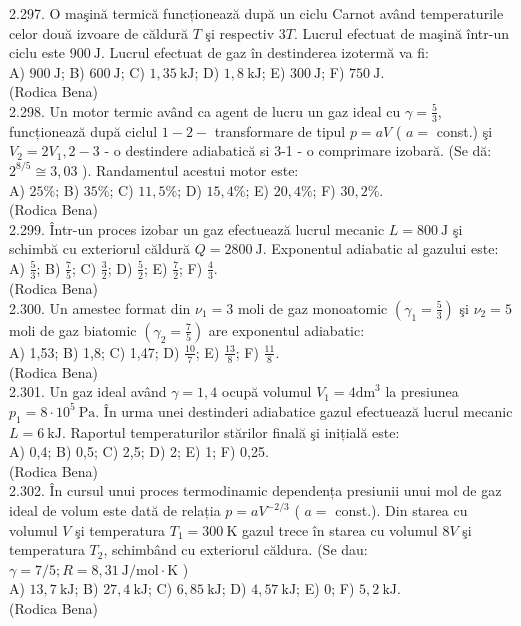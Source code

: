 2.297. O maşină termică funcționează după un ciclu Carnot având temperaturile celor două izvoare de căldură $T$ şi respectiv $3 T$. Lucrul efectuat de maşină într-un ciclu este $900 \mathrm{~J}$. Lucrul efectuat de gaz în destinderea izotermă va fi:\\ A) $900 \mathrm{~J}$; B) $600 \mathrm{~J}$; C) $1,35 \mathrm{~kJ}$; D) $1,8 \mathrm{~kJ}$; E) $300 \mathrm{~J}$; F) $750 \mathrm{~J}$.\\ (Rodica Bena)\\

2.298. Un motor termic având ca agent de lucru un gaz ideal cu $\gamma=\frac{5}{3}$, funcționează după ciclul $1-2-$ transformare de tipul $p=a V$ ( $a=$ const.) şi $V_{2}=2 V_{1}, 2-3$ - o destindere adiabatică si 3-1 - o comprimare izobară. (Se dă: $2^{8 / 5} \cong 3,03$ ). Randamentul acestui motor este:\\ A) $25 \%$; B) $35 \%$; C) $11,5 \%$; D) $15,4 \%$; E) $20,4 \%$; F) $30,2 \%$.\\ (Rodica Bena)\\

2.299. Într-un proces izobar un gaz efectuează lucrul mecanic $L=800 \mathrm{~J}$ şi schimbă cu exteriorul căldură $Q=2800 \mathrm{~J}$. Exponentul adiabatic al gazului este:\\ A) $\frac{5}{3}$; B) $\frac{7}{5}$; C) $\frac{3}{2}$; D) $\frac{5}{2}$; E) $\frac{7}{2}$; F) $\frac{4}{3}$.\\ (Rodica Bena)\\

2.300. Un amestec format din $\nu_{1}=3$ moli de gaz monoatomic $\left(\gamma_{1}=\frac{5}{3}\right)$ şi $\nu_{2}=5$ moli de gaz biatomic $\left(\gamma_{2}=\frac{7}{5}\right)$ are exponentul adiabatic:\\ A) 1,53; B) 1,8; C) 1,47; D) $\frac{10}{7}$; E) $\frac{13}{8}$; F) $\frac{11}{8}$.\\ (Rodica Bena)\\

2.301. Un gaz ideal având $\gamma=1,4$ ocupă volumul $V_{1}=4 \mathrm{dm}^{3}$ la presiunea $p_{1}=8 \cdot 10^{5} \mathrm{~Pa}$. În urma unei destinderi adiabatice gazul efectuează lucrul mecanic $L=6 \mathrm{~kJ}$. Raportul temperaturilor stărilor finală şi inițială este:\\ A) 0,4; B) 0,5; C) 2,5; D) 2; E) 1; F) 0,25.\\ (Rodica Bena)\\

2.302. În cursul unui proces termodinamic dependența presiunii unui mol de gaz ideal de volum este dată de relația $p=a V^{-2 / 3}$ ( $a=$ const.). Din starea cu volumul $V$ şi temperatura $T_{1}=300 \mathrm{~K}$ gazul trece în starea cu volumul $8 V$ şi temperatura $T_{2}$, schimbând cu exteriorul căldura. (Se dau: $\gamma=7 / 5 ; R=8,31 \mathrm{~J} / \mathrm{mol} \cdot \mathrm{K}$ )\\ A) $13,7 \mathrm{~kJ}$; B) $27,4 \mathrm{~kJ}$; C) $6,85 \mathrm{~kJ}$; D) $4,57 \mathrm{~kJ}$; E) 0; F) $5,2 \mathrm{~kJ}$.\\ (Rodica Bena)\\

